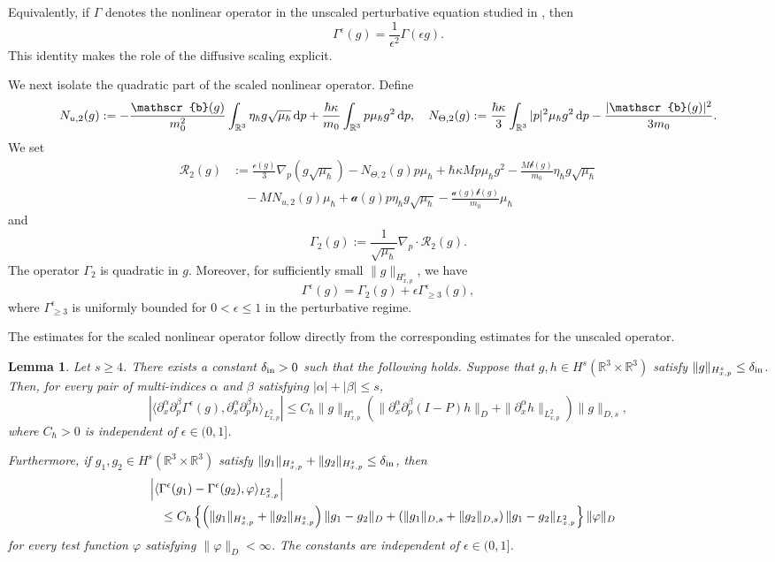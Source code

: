 \documentclass[10pt,reqno]{amsart}
\numberwithin{equation}{section}
\newtheorem{lemma}{Lemma}[section]
\newcommand{\lt}{\left}
\newcommand{\rt}{\right}
\newcommand{\lal}{\langle}
\newcommand{\ral}{\rangle}
\newcommand{\mR}{\mathbb{R}}
\newcommand{\intr}{\int_{\mR^3}}
\newcommand{\R}{\mathbb R}
\newcommand{\bq}{\begin{equation}}
\newcommand{\eq}{\end{equation}}
\newcommand{\calR}{\mathcal R}
\newcommand{\rdp}{\textnormal{d}p}
\begin{document}
Equivalently, if $\Gamma$ denotes the nonlinear operator in the unscaled perturbative equation studied in \cite{CHHpre}, then
\bq\label{eq:Gam-scale}
\Gamma^\epsilon(g)=\frac{1}{\epsilon^2}\Gamma(\epsilon g).
\eq
This identity makes the role of the diffusive scaling explicit.

We next isolate the quadratic part of the scaled nonlinear operator. Define
\[
N_{u,2}(g):=-\frac{\mathscr{b}(g)}{m_0^2}\intr \eta_\hbar g\sqrt{\mu_\hbar}\,\rdp+\frac{\hbar\kappa}{m_0 }\intr p\mu_\hbar g^2\,\rdp,\quad N_{\Theta,2}(g):=\frac{\hbar\kappa}{3}\intr |p|^2\mu_\hbar g^2\,\rdp - \frac{|\mathscr{b}(g)|^2}{3m_0 }.
\]
We set
\[\begin{aligned}
\calR_2 (g)&:=\frac{\mathscr{c}(g)}{3}\nabla_p\lt(g\sqrt{\mu_\hbar}\rt)-N_{\Theta,2}(g)p\mu_\hbar+\hbar\kappa M  p\mu_\hbar g^2-\frac{M  \mathscr{b}(g)}{m_0 }\eta_\hbar g\sqrt{\mu_\hbar}\\
&\quad -M  N_{u,2}(g)\mu_\hbar+\mathscr{a}(g)p\eta_\hbar g\sqrt{\mu_\hbar}-\frac{\mathscr{a}(g)\mathscr{b}(g)}{m_0 }\mu_\hbar
\end{aligned}\]
and
\bq\label{eq:Gam2-h}
\Gamma_2 (g):=\frac{1}{\sqrt{\mu_\hbar}}\nabla_p\cdot\calR_2 (g).
\eq
The operator $\Gamma_2 $ is quadratic in $g$. Moreover, for sufficiently small $\|g\|_{H^s_{x,p}}$, we have
\bq\label{eq:Gam-dec-eps}
\Gamma^\epsilon(g)=\Gamma_2 (g)+\epsilon\Gamma^\epsilon_{\ge3}(g),
\eq
where $\Gamma^\epsilon_{\ge3}$ is uniformly bounded for $0<\epsilon\le1$ in the perturbative regime.

The estimates for the scaled nonlinear operator follow directly from the corresponding estimates for the unscaled operator.

\begin{lemma}\label{lem:Gam-eps-est}
Let $s\ge4$. There exists a constant $\delta_{\rm in}>0$ such that the following holds. Suppose that $g,h\in H^s(\R^3\times\R^3)$ satisfy $\|g\|_{H^s_{x,p}}\le\delta_{\rm in}$.
Then, for every pair of multi-indices $\alpha$ and $\beta$ satisfying $|\alpha|+|\beta|\le s$,
\bq\label{eq:Gam-eps-est}
\lt|\lal\partial_x^\alpha\partial_p^\beta\Gamma^\epsilon(g),\partial_x^\alpha\partial_p^\beta h\ral_{L^2_{x,p}}\rt|\le C_\hbar\|g\|_{H^s_{x,p}}\lt(\|\partial_x^\alpha\partial_p^\beta(I-P)h\|_{D }+\|\partial_x^\alpha h\|_{L^2_{x,p}}\rt)\|g\|_{D,s},
\eq
where $C_\hbar>0$ is independent of $\epsilon\in(0,1]$.

Furthermore, if $g_1,g_2\in H^s(\R^3\times\R^3)$ satisfy $\|g_1\|_{H^s_{x,p}}+\|g_2\|_{H^s_{x,p}}\le\delta_{\rm in}$, then
\bq\label{eq:Gam-eps-diff}
\begin{aligned}
&\lt|\lal\Gamma^\epsilon(g_1)-\Gamma^\epsilon(g_2),\varphi\ral_{L^2_{x,p}}\rt|\cr
&\quad \le C_\hbar\lt\{ \lt(\|g_1\|_{H^s_{x,p}}+\|g_2\|_{H^s_{x,p}}\rt)\|g_1-g_2\|_{D }  +\lt(\|g_1\|_{D,s}+\|g_2\|_{D,s}\rt)\|g_1-g_2\|_{L^2_{x,p}}\rt\}\|\varphi\|_{D }
\end{aligned}
\eq
for every test function $\varphi$ satisfying $\|\varphi\|_{D }<\infty$. The constants are independent of $\epsilon\in(0,1]$.
\end{lemma}
\end{document}
